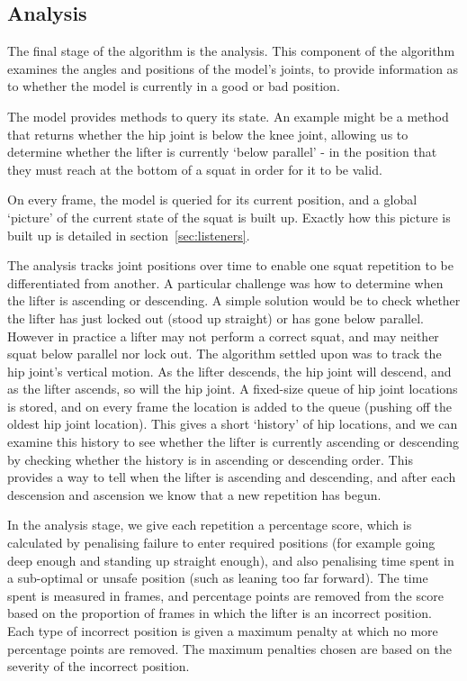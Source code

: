 \subsection{Analysis}

The final stage of the algorithm is the analysis. This component of the algorithm examines the angles and positions of the model's joints, to provide information as to whether the model is currently in a good or bad position.

The model provides methods to query its state. An example might be a method that returns whether the hip joint is below the knee joint, allowing us to determine whether the lifter is currently `below parallel' - in the position that they must reach at the bottom of a squat in order for it to be valid. 

On every frame, the model is queried for its current position, and a global `picture' of the current state of the squat is built up. Exactly how this picture is built up is detailed in section~\ref{sec:listeners}.

The analysis tracks joint positions over time to enable one squat repetition to be differentiated from another. A particular challenge was how to determine when the lifter is ascending or descending. A simple solution would be to check whether the lifter has just locked out (stood up straight) or has gone below parallel. However in practice a lifter may not perform a correct squat, and may neither squat below parallel nor lock out. The algorithm settled upon was to track the hip joint's vertical motion. As the lifter descends, the hip joint will descend, and as the lifter ascends, so will the hip joint. A fixed-size queue of hip joint locations is stored, and on every frame the location is added to the queue (pushing off the oldest hip joint location). This gives a short `history' of hip locations, and we can examine this history to see whether the lifter is currently ascending or descending by checking whether the history is in ascending or descending order. This provides a way to tell when the lifter is ascending and descending, and after each descension and ascension we know that a new repetition has begun.

In the analysis stage, we give each repetition a percentage score, which is calculated by penalising failure to enter required positions (for example going deep enough and standing up straight enough), and also penalising time spent in a sub-optimal or unsafe position (such as leaning too far forward). The time spent is measured in frames, and percentage points are removed from the score based on the proportion of frames in which the lifter is an incorrect position. Each type of incorrect position is given a maximum penalty at which no more percentage points are removed. The maximum penalties chosen are based on the severity of the incorrect position.

